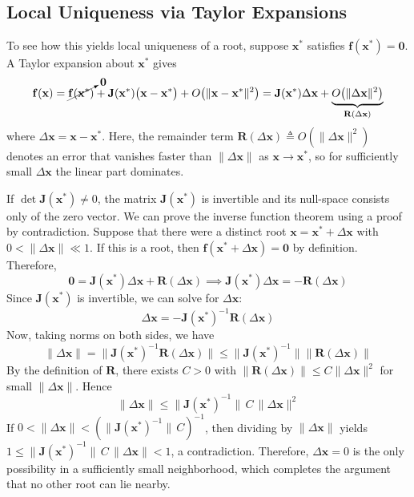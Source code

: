 \subsection{Local Uniqueness via Taylor Expansions}
To see how this yields local uniqueness of a root, suppose \(\mathbf x^*\) satisfies \(\mathbf f(\mathbf x^*)= \mathbf 0\).  A Taylor expansion about \(\mathbf x^*\) gives
\begin{equation}
\mathbf f(\mathbf x)
=\cancelto{\mathbf0}{\mathbf f(\mathbf x^*)}
+\mathbf J(\mathbf x^*)\bigl(\mathbf x-\mathbf x^*\bigr)
+ O\bigl(\|\mathbf x-\mathbf x^*\|^2\bigr)
=\mathbf J(\mathbf x^*) \Delta\mathbf x
+\underbrace{O\bigl(\|\Delta\mathbf x\|^2\bigr)}_{\mathbf{R}(\Delta\mathbf x)}
\end{equation}
where \(\Delta\mathbf x=\mathbf x-\mathbf x^*\).  Here, the remainder term \(\mathbf{R}(\Delta\mathbf x) \triangleq O(\|\Delta\mathbf x\|^2)\) denotes an error that vanishes faster than \(\|\Delta\mathbf x\|\) as \(\mathbf x\to\mathbf x^*\), so for sufficiently small \(\Delta\mathbf x\) the linear part dominates.

If \(\det \mathbf J(\mathbf x^*)\neq 0\), the matrix \(\mathbf J(\mathbf x^*)\) is invertible and its null-space consists only of the zero vector.  We can prove the inverse function theorem using a proof by contradiction. Suppose that there were a distinct root \(\mathbf x=\mathbf x^*+\Delta\mathbf x\) with \(0<\|\Delta\mathbf x\|\ll1\). If this is a root, then \(\mathbf f(\mathbf x^*+\Delta\mathbf x) = \mathbf 0\) by definition. Therefore, %
\begin{equation}
\mathbf{0} = \mathbf J(\mathbf x^*) \Delta\mathbf x + \mathbf{R}(\Delta\mathbf x) \implies
\mathbf J(\mathbf x^*) \Delta\mathbf x = - \mathbf{R}(\Delta\mathbf x)
\end{equation}
Since \(\mathbf J(\mathbf x^*)\) is invertible, we can solve for \(\Delta\mathbf x\):
\begin{equation}
\Delta\mathbf x = - \mathbf J(\mathbf x^*)^{-1} \mathbf{R}(\Delta\mathbf x)
\end{equation}
Now, taking norms on both sides, we have
\begin{equation}
\|\Delta\mathbf x\|
=\bigl\|\mathbf J(\mathbf x^*)^{-1}\mathbf{R}(\Delta\mathbf x)\bigr\|
\le \bigl\|\mathbf J(\mathbf x^*)^{-1}\bigr\|\bigl\|\mathbf{R}(\Delta\mathbf x)\bigr\|
\end{equation}
By the definition of $\mathbf R$, there exists $C>0$ with
$\|\mathbf R(\Delta\mathbf x)\|\le C\|\Delta\mathbf x\|^2$ for small $\|\Delta\mathbf x\|$.
Hence
\begin{equation}
\|\Delta\mathbf x\|
\le \|\mathbf J(\mathbf x^*)^{-1}\|\,C\,\|\Delta\mathbf x\|^2
\end{equation}
If $0<\|\Delta\mathbf x\|<(\|\mathbf J(\mathbf x^*)^{-1}\|\,C)^{-1}$, then dividing by $\|\Delta\mathbf x\|$ yields $1\le \|\mathbf J(\mathbf x^*)^{-1}\|\,C\,\|\Delta\mathbf x\|<1$, a contradiction. Therefore, $\Delta\mathbf x=0$ is the only possibility in a sufficiently small neighborhood, which completes the argument that no other root can lie nearby.

